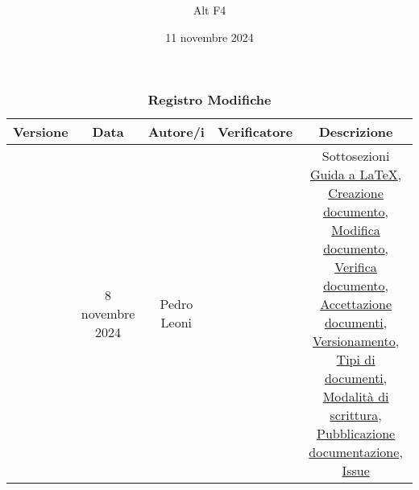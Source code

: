 \documentclass[a4paper, 12pt]{article}
\title{\Huge \textbf{\titolo}}
\author{\Large{Alt} \raisebox{0.3ex}{\normalsize  +} \Large{F4}}
\date{ 11 novembre 2024}
\def\logo{../Immagini/logo.jpeg}
\begin{document}
\begin{titlepage}      
    \maketitle
    \thispagestyle{empty}  

\end{titlepage}

\thispagestyle{plain}
\begin{table}[!h]
    \centering
    \caption*{\textbf{\Large Registro Modifiche}}
    {\renewcommand{\arraystretch}{2}
    \begin{tabularx}{\textwidth}{| c | c | C | C | C |}
        \hline
            \textbf{\normalsize Versione} & 
            \textbf{\normalsize Data} & 
            \textbf{\normalsize Autore/i} & 
            \textbf{\normalsize Verificatore} &
            \textbf{\normalsize Descrizione} \\ 
        \hline \hline
         & 
        8 novembre 2024  & 
        Pedro Leoni &
        & 
        Sottosezioni \hyperref[subsec:cre]{Guida a \LaTeX}, 
        \hyperref[subsec:cre]{Creazione documento}, \hyperref[subsec:cre]{Modifica documento}, \hyperref[subsec:ver]{Verifica documento}, \hyperref[subsec:acc]{Accettazione documenti}, \hyperref[subsec:vers]{Versionamento}, \hyperref[subsec:docs]{Tipi di documenti}, \hyperref[subsec:mod]{Modalità di scrittura}, \hyperref[subsec:pub]{Pubblicazione documentazione}, \hyperref[subsec:issue]{Issue}\\
        \hline 
    \end{tabularx}}
\end{table}
\restoregeometry
\end{document}
